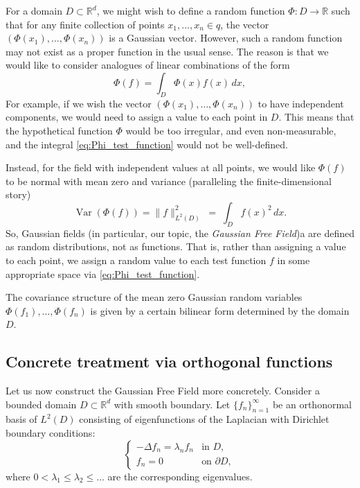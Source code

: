 \documentclass[letterpaper,11pt,oneside,reqno]{article}
\numberwithin{equation}{section}
\theoremstyle{definition}
\begin{document}
For a domain $D \subset \mathbb{R}^d$, we might wish to
define a random function $\Phi: D \rightarrow \mathbb{R}$
such that for any finite collection of points $x_1, \ldots,
x_n \in q$, the vector $(\Phi(x_1), \ldots, \Phi(x_n))$ is a
Gaussian vector. However, such a random function may not
exist as a proper function in the usual sense.
The reason is that we would like to consider analogues of linear combinations
of the form
\begin{equation}
	\label{eq:Phi_test_function}
    \Phi(f) = \int_D \Phi(x) f(x) \, dx,
\end{equation}
For example, if we wish the vector $(\Phi(x_1), \ldots, \Phi(x_n))$ to have independent components, we would need to assign a value to each point in $D$. This means that the hypothetical function $\Phi$ would be too irregular, and even non-measurable, and the integral
\eqref{eq:Phi_test_function} would not be well-defined.

Instead, for the field with independent values at all points, we would like $\Phi(f)$ to be normal
with mean zero and variance (paralleling the finite-dimensional story)
\begin{equation*}
	\operatorname{\mathrm{Var}}\left(
	\Phi(f)\right) = \|f\|^2_{L^2(D)} \;=\; \int_D f(x)^2 \, dx.
\end{equation*}
So, Gaussian fields (in particular, our topic, the \emph{Gaussian Free Field})a
are defined as random distributions, not as functions.
That is, rather than assigning a value to each point,
we assign a random value to each test function $f$ in some appropriate space
via \eqref{eq:Phi_test_function}.

The covariance structure of the mean zero Gaussian random variables
$\Phi(f_1), \ldots, \Phi(f_n)$ is given by a certain bilinear
form determined by the domain $D$.


\subsection{Concrete treatment via orthogonal functions}

Let us now construct the Gaussian Free Field more concretely. Consider a bounded domain $D \subset \mathbb{R}^d$ with smooth boundary. Let $\{f_n\}_{n=1}^{\infty}$ be an orthonormal basis of $L^2(D)$ consisting of eigenfunctions of the Laplacian with Dirichlet boundary conditions:
\begin{equation}
    \begin{cases}
        -\Delta f_n = \lambda_n f_n & \text{in } D, \\
        f_n = 0 & \text{on } \partial D,
    \end{cases}
\end{equation}
where $0 < \lambda_1 \leq \lambda_2 \leq \ldots$ are the corresponding eigenvalues.
\end{document}

